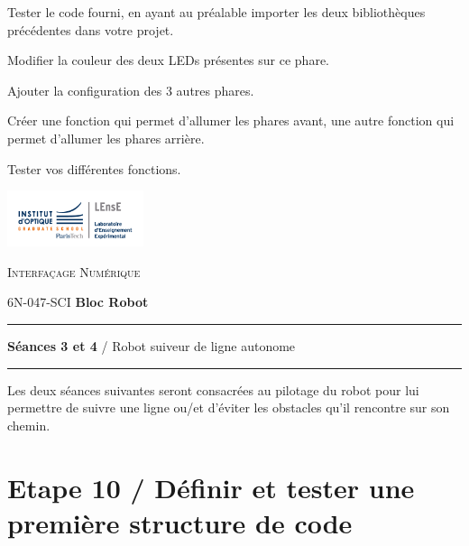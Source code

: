 \documentclass[a4paper,11pt,titlepage]{article} %
\begin{document}
\Manip Tester le code fourni, en ayant au préalable importer les deux bibliothèques précédentes dans votre projet.

\Manip Modifier la couleur des deux LEDs présentes sur ce phare.

\Manip Ajouter la configuration des 3 autres phares.

\Manip Créer une fonction qui permet d'allumer les phares avant, une autre fonction qui permet d'allumer les phares arrière.

\Manip Tester vos différentes fonctions.


\newpage
\strut %
\begin{minipage}[c]{.25\linewidth}
	\includegraphics[width=4cm]{images/Logo-LEnsE.png}
\end{minipage} \hfill
\begin{minipage}[c]{.4\linewidth}

\begin{center}
\vspace{0.3cm}
{\Large \textsc{Interfaçage Numérique}}

\medskip

6N-047-SCI \qquad \textbf{\Large Bloc Robot}

\end{center}
\end{minipage}\hfill

\vspace{0.5cm}

\noindent \rule{\linewidth}{1pt}

{\noindent\Large \rule[-7pt]{0pt}{30pt} \textbf{Séances 3 et 4} / Robot suiveur de ligne autonome} 

\noindent \rule{\linewidth}{1pt}

Les deux séances suivantes seront consacrées au pilotage du robot pour lui permettre de suivre une ligne ou/et d'éviter les obstacles qu'il rencontre sur son chemin.

\section{Etape 10 / Définir et tester une première structure de code}
\end{document}
